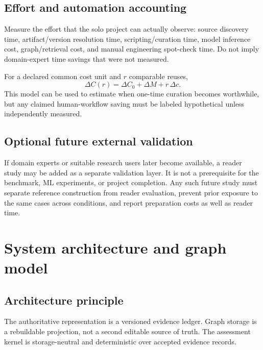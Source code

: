 \documentclass[11pt,a4paper]{article}
\begin{document}
\subsection{Effort and automation accounting}
Measure the effort that the solo project can actually observe: source discovery time, artifact/version resolution time, scripting/curation time, model inference cost, graph/retrieval cost, and manual engineering spot-check time. Do not imply domain-expert time savings that were not measured.

For a declared common cost unit and $r$ comparable reuses,
\[
\Delta C(r)=\Delta C_0+\Delta M+r\,\Delta c.
\]
This model can be used to estimate when one-time curation becomes worthwhile, but any claimed human-workflow saving must be labeled hypothetical unless independently measured.

\subsection{Optional future external validation}
If domain experts or suitable research users later become available, a reader study may be added as a separate validation layer. It is not a prerequisite for the benchmark, ML experiments, or project completion. Any such future study must separate reference construction from reader evaluation, prevent prior exposure to the same cases across conditions, and report preparation costs as well as reader time.

\section{System architecture and graph model}
\label{sec:architecture}
\subsection{Architecture principle}
The authoritative representation is a versioned evidence ledger. Graph storage is a rebuildable projection, not a second editable source of truth. The assessment kernel is storage-neutral and deterministic over accepted evidence records.
\end{document}

